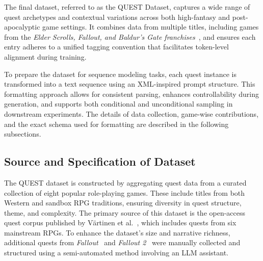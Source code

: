 The final dataset, referred to as the QUEST Dataset, captures a wide range of quest
archetypes and contextual variations across both high-fantasy and post-apocalyptic game
settings. It combines data from multiple titles, including games from the \textit{Elder Scrolls,
Fallout, and Baldur's Gate franchises}~\cite{theelderscrollsivoblivion,theelderscrollsvskyrim,fallout1,fallout2,baldursgate,baldursgate2shadowsofamn}, and ensures each entry adheres to a unified
tagging convention that facilitates token-level alignment during training.

To prepare the dataset for sequence modeling tasks, each quest instance is transformed
into a text sequence using an XML-inspired prompt structure. This formatting approach
allows for consistent parsing, enhances controllability during generation, and supports
both conditional and unconditional sampling in downstream experiments. The details of
data collection, game-wise contributions, and the exact schema used for formatting are
described in the following subsections.

\subsection{Source and Specification of Dataset}

The QUEST dataset is constructed by aggregating quest data from a curated collection
of eight popular role-playing games. These include titles from both Western and sandbox
RPG traditions, ensuring diversity in quest structure, theme, and complexity. The
primary source of this dataset is the open-access quest corpus published by V{\"a}rtinen et
al.~\cite{vartinen2022generating}, which includes quests from six mainstream RPGs. To enhance the dataset's
size and narrative richness, additional quests from \textit{Fallout}~\cite{fallout1} and \textit{Fallout 2}~\cite{fallout2} were
manually collected and structured using a semi-automated method involving an LLM
assistant.


